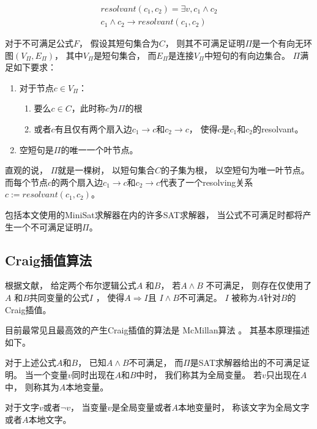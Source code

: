 \begin{equation}
\begin{array}{ccc}
&resolvant(c_1,c_2) = \exists v, c_1\wedge c_2 &\\
&c_1\wedge c_2 \to resolvant(c_1,c_2)&
\end{array}
\end{equation}

\begin{definition}
对于不可满足公式$F$，
假设其短句集合为$C$，
则其不可满足证明$\Pi$是一个有向无环图$(V_{\Pi},E_{\Pi})$，
其中$V_{\Pi}$是短句集合，
而$E_{\Pi}$是连接$V_{\Pi}$中短句的有向边集合。
$\Pi$满足如下要求：
\begin{enumerate}
\item 对于节点$c\in V_{\Pi}$：
  \begin{enumerate}
    \item 要么$c\in C$，此时称$c$为$\Pi$的根
    \item 或者$c$有且仅有两个扇入边$c_1\to c$和$c_2\to c$，
    使得$c$是$c_1$和$c_2$的resolvant。
  \end{enumerate}
\item 空短句是$\Pi$的唯一一个叶节点。
\end{enumerate}
\end{definition}

直观的说，
$\Pi$就是一棵树，
以短句集合$C$的子集为根，
以空短句为唯一叶节点。
而每个节点$c$的两个扇入边$c_1\to c$和$c_2\to c$代表了一个resolving关系$c:=resolvant(c_1,c_2)$。

包括本文使用的MiniSat求解器在内的许多SAT求解器，
当公式不可满足时都将产生一个不可满足证明$\Pi$。

\subsection{Craig插值算法}

根据文献，
给定两个布尔逻辑公式$A$ 和$B$，
若$A\wedge B$ 不可满足，
则存在仅使用了$A$ 和$B$共同变量的公式$I$ ，
使得$A\Rightarrow I$且
$I\wedge B$不可满足。
$I$ 被称为$A$针对$B$的Craig插值。

目前最常见且最高效的产生Craig插值的算法是
McMillan算法 。
其基本原理描述如下。

对于上述公式$A$和$B$，
已知$A\wedge B$不可满足，
而$\Pi$是SAT求解器给出的不可满足证明。
当一个变量$v$同时出现在$A$和$B$中时，
我们称其为全局变量。
若$v$只出现在$A$中，
则称其为$A$本地变量。

对于文字$v$或者$\neg v$，
当变量$v$是全局变量或者$A$本地变量时，
称该文字为全局文字或者$A$本地文字。

